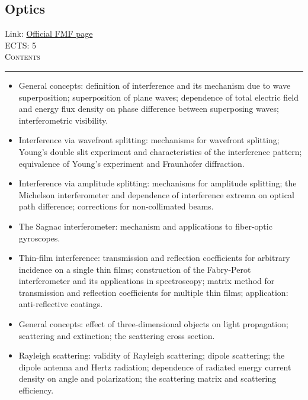 \documentclass[11pt, a4paper]{article}
\newenvironment{course}[3]{
\subsection{#1}%
Link: \href{#2}{Official FMF page}\\%
ECTS: #3%
\vspace{1ex}
\\
{\large \textsc{Contents}}\\[-0.9ex]%
\rule{\textwidth}{0.5pt}
\vspace{-3ex}
}
{}
\newenvironment{chapter}[1]{
\begin{tcolorbox}[title=#1, breakable]
}
{\end{tcolorbox}}
\begin{document}
\begin{course}{Optics}{https://www.fmf.uni-lj.si/en/study-physics/programmes/1fiz/2020/7000777/courses/1165/}{5}
\begin{chapter}{Diffraction}
\begin{itemize}
        \end{itemize}
    \end{chapter}

    \begin{chapter}{Optical interference}
        \begin{itemize}
        
            \item General concepts: definition of interference and its mechanism due to wave superposition; superposition of plane waves; dependence of total electric field and energy flux density on phase difference between superposing waves; interferometric visibility.

            \item Interference via wavefront splitting: mechanisms for wavefront splitting; Young's double slit experiment and characteristics of the interference pattern; equivalence of Young's experiment and Fraunhofer diffraction.

            \item Interference via amplitude splitting: mechanisms for amplitude splitting; the Michelson interferometer and dependence of interference extrema on optical path difference; corrections for non-collimated beams.

            \item The Sagnac interferometer: mechanism and applications to fiber-optic gyroscopes.

            \item Thin-film interference: transmission and reflection coefficients for arbitrary incidence on a single thin films; construction of the Fabry-Perot interferometer and its applications in spectroscopy; matrix method for transmission and reflection coefficients for multiple thin films; application: anti-reflective coatings.

        \end{itemize}
    \end{chapter}

    \begin{chapter}{Optical scattering}
        \begin{itemize}
        
            \item General concepts: effect of three-dimensional objects on light propagation; scattering and extinction; the scattering cross section.

            \item Rayleigh scattering: validity of Rayleigh scattering; dipole scattering; the dipole antenna and Hertz radiation; dependence of radiated energy current density on angle and polarization; the scattering matrix and scattering efficiency.


\end{itemize}
\end{chapter}
\end{course}
\end{document}
